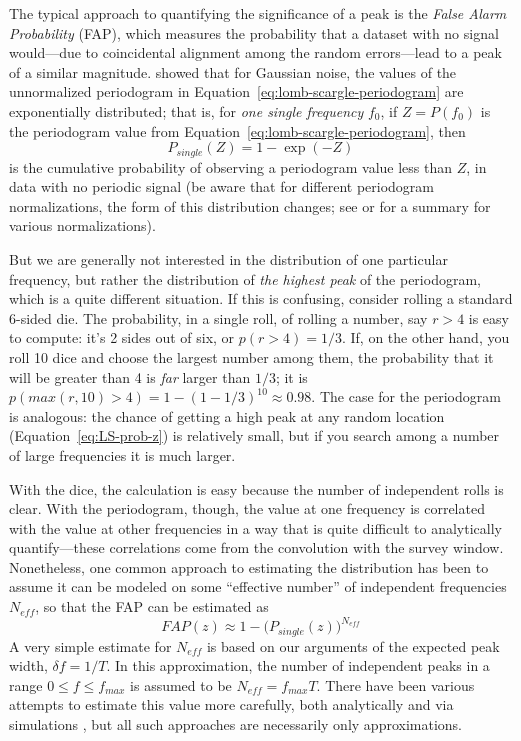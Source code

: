 \documentclass[preprint]{aastex}
\newcommand{\Eq}[1]{Equation~\ref{eq:#1}}
\newcommand{\eq}[1]{\Eq{#1}}
\newcommand{\eqlabel}[1]{\label{eq:#1}}
\begin{document}
The typical approach to quantifying the significance of a peak is the {\it
False Alarm Probability} (FAP), which measures the probability that a dataset
with no signal would---due to coincidental alignment among the random
errors---lead to a peak of a similar magnitude.
\citet{Scargle82} showed that for Gaussian noise, the values of the unnormalized
periodogram in \eq{lomb-scargle-periodogram} are exponentially distributed;
that is, for {\it one single frequency} $f_0$, if $Z = P(f_0)$ is the
periodogram value from \eq{lomb-scargle-periodogram}, then
\begin{equation}
  P_{single}(Z) = 1 - \exp(-Z)
  \eqlabel{LS-prob-z}
\end{equation}
is the cumulative probability of observing a periodogram value less than $Z$,
in data with no periodic signal
(be aware that for different periodogram normalizations,
the form of this distribution changes; see \citet{Cumming99} or
\citet{Baluev2008} for a summary for various normalizations).


But we are generally not interested in the distribution of one particular
frequency, but rather the distribution of {\it the highest peak} of the
periodogram, which is a quite different situation.
If this is confusing, consider rolling a standard 6-sided die.
The probability, in a single roll, of rolling a number, say $r > 4$ is easy
to compute: it's 2 sides out of six, or $p(r>4) = 1/3$.
If, on the other hand, you roll 10 dice and choose the largest number among
them, the probability that it will be greater than 4 is {\it far} larger
than $1/3$; it is $p(max(r,10) > 4) = 1 - (1 - 1/3)^{10} \approx 0.98$.
The case for the periodogram is analogous: the chance of getting a high peak
at any random location (\eq{LS-prob-z}) is relatively small, but if you search
among a number of large frequencies it is much larger.

With the dice, the calculation is easy because the number of independent
rolls is clear.
With the periodogram, though, the value at one frequency is correlated with
the value at other frequencies in a way that is quite difficult to analytically
quantify---these correlations come from the convolution with the survey
window.
Nonetheless, one common approach to estimating the distribution has been to
assume it can be modeled on some ``effective number'' of independent
frequencies $N_{eff}$, so that the FAP can be estimated as
\begin{equation}
  FAP(z) \approx 1 - \big(P_{single}(z)\big)^{N_{eff}}
  \eqlabel{FAP-neff}
\end{equation}
A very simple estimate for $N_{eff}$ is based on our arguments of the
expected peak width, $\delta f = 1/T$.
In this approximation, the number of independent peaks in a range
$0 \le f \le f_{max}$ is assumed to be $N_{eff} = f_{max} T$.
There have been various attempts to estimate this value more carefully,
both analytically and via simulations
\citep[see, e.g.][]{Horne86,Schwarzenberg-Czerny98,Cumming04,Frescura08},
but all such approaches are necessarily only approximations.
\end{document}
